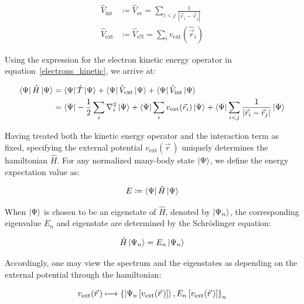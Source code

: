 \begin{equation}
\begin{aligned}
    \hat{V}_\mathrm{int} &\coloneqq \hat{V}_{\mathrm{ee}}
    = \sum_{i<j}\frac{1}{|\vec{r}_i-\vec{r}_j|} \\
    \hat{V}_\mathrm{ext} &\coloneqq \hat{V}_{\mathrm{eN}}
    =\sum_i v_\mathrm{ext}(\hat{\vec{r}}_i)
\end{aligned}
\label{reduced_operator_definition}
\end{equation}

Using the expression for the electron kinetic energy operator in equation~\eqref{electrons_kinetic}, we arrive at:

\begin{equation}
\begin{aligned}
    \bra{\Psi}\hat{H}\ket{\Psi} &= \bra{\Psi}\hat{T}\ket{\Psi} + \bra{\Psi}\hat{V}_\mathrm{ext}\ket{\Psi} + \bra{\Psi}\hat{V}_\mathrm{int}\ket{\Psi} \\
    &= \bra{\Psi}-\frac{1}{2}\sum_i\nabla_i^2\ket{\Psi}
    + \bra{\Psi}\sum_i v_{\mathrm{ext}}(\vec{r}_i)\ket{\Psi}
    + \bra{\Psi}\sum_{i<j}\frac{1}{|\vec{r}_i-\vec{r}_j|}\ket{\Psi}
\end{aligned}
\label{approx}
\end{equation}

Having treated both the kinetic energy operator and the interaction term as fixed, specifying the external potential $v_\mathrm{ext}(\vec{r}\,)$ uniquely determines the hamiltonian $\hat{H}$.
For any normalized many-body state $\ket{\Psi}$, we define the energy expectation value as:

\begin{equation}
    E \coloneqq \bra{\Psi}\hat{H}\ket{\Psi}
\label{energy_expectation_value_definition}
\end{equation}

When $\ket{\Psi}$ is chosen to be an eigenstate of $\hat{H}$, denoted by $\ket{\Psi_n}$,
the corresponding eigenvalue $E_n$ and eigenstate are determined by the Schrödinger equation:

\begin{equation}
    \hat{H}\ket{\Psi_n}=E_n\ket{\Psi_n}
\label{schrodinger_eigenvalue_equation}
\end{equation}

Accordingly, one may view the spectrum and the eigenstates as depending on the external potential through the hamiltonian:

\begin{equation}
    v_\mathrm{ext}(\vec{r}\,) \longmapsto \left\{\ket{\Psi_n\left[v_\mathrm{ext}(\vec{r}\,)\right]}, E_n\left[v_\mathrm{ext}(\vec{r}\,)\right]\right\}_{n}
\label{spectrum_mapping_from_external_potential}
\end{equation}

